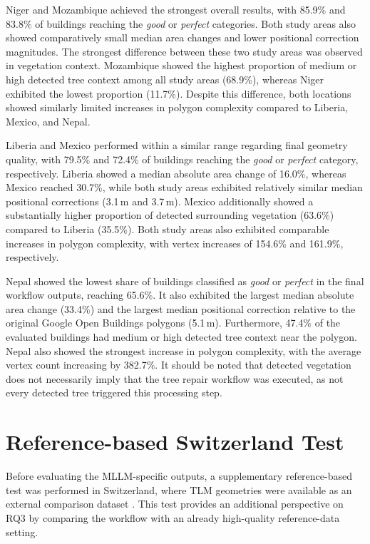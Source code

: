 Niger and Mozambique achieved the strongest overall results, with 85.9\% and 83.8\% of buildings reaching the \textit{good} or \textit{perfect} categories. Both study areas also showed comparatively small median area changes and lower positional correction magnitudes. The strongest difference between these two study areas was observed in vegetation context. Mozambique showed the highest proportion of medium or high detected tree context among all study areas (68.9\%), whereas Niger exhibited the lowest proportion (11.7\%). Despite this difference, both locations showed similarly limited increases in polygon complexity compared to Liberia, Mexico, and Nepal.

Liberia and Mexico performed within a similar range regarding final geometry quality, with 79.5\% and 72.4\% of buildings reaching the \textit{good} or \textit{perfect} category, respectively. Liberia showed a median absolute area change of 16.0\%, whereas Mexico reached 30.7\%, while both study areas exhibited relatively similar median positional corrections (3.1\,m and 3.7\,m). Mexico additionally showed a substantially higher proportion of detected surrounding vegetation (63.6\%) compared to Liberia (35.5\%). Both study areas also exhibited comparable increases in polygon complexity, with vertex increases of 154.6\% and 161.9\%, respectively.

Nepal showed the lowest share of buildings classified as \textit{good} or \textit{perfect} in the final workflow outputs, reaching 65.6\%. It also exhibited the largest median absolute area change (33.4\%) and the largest median positional correction relative to the original Google Open Buildings polygons (5.1\,m). Furthermore, 47.4\% of the evaluated buildings had medium or high detected tree context near the polygon. Nepal also showed the strongest increase in polygon complexity, with the average vertex count increasing by 382.7\%. It should be noted that detected vegetation does not necessarily imply that the tree repair workflow was executed, as not every detected tree triggered this processing step.

\section{Reference-based Switzerland Test}
\label{sec:switzerlandrsults}
Before evaluating the MLLM-specific outputs, a supplementary reference-based test was performed in Switzerland, where TLM geometries were available as an external comparison dataset \citep{swisstopo_swisstlm3d}.
This test provides an additional perspective on RQ3 by comparing the workflow with an already high-quality reference-data setting.

